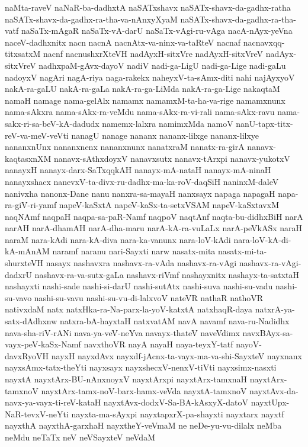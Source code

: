 {naMta-raveV
naNaR-ba-dadhxtA
naSATxshavx
naSATx-shavx-da-gadhx-ratha
naSATx-shavx-da-gadhx-ra-tha-va-nAnxyXyaM
naSATx-shavx-da-gadhx-ra-tha-vatf
naSaTx-mAgaR
naSaTx-vA-darU
naSaTx-vAgi-ru-vAga
nacA-nAyx-yeVna
naceV-dadhxnitx
nacn
nacnA
nacnAtx-va-ninx-va-taRteV
nacnaf
nacnavxqq-titxsatxM
nacnf
nacnushxrXteVH
nadAyxH-sitxVre
nadAyxH-sitxVreV
nadAyx-sitxVreV
nadhxpaM-gAvx-dayoV
nadiV
nadi-ga-LigU
nadi-ga-Lige
nadi-gaLu
nadoyxV
nagAri
nagA-riya
naga-rakekx
naheyxV-ta-sAmx-diti
nahi
najAyxyoV
nakA-ra-gaLU
nakA-ra-gaLa
nakA-ra-ga-LiMda
nakA-ra-ga-Lige
nakaqtaM
namaH
namage
nama-gelAlx
namamx
namamxM-ta-ha-va-rige
namamxnunx
nama-sAkxra
nama-sAkx-ra-veMdu
nama-sAkx-ra-vi-rali
nama-sAkx-ravu
nama-sakx-ri-sa-beV-kA-dadudx
namemx-lalxra
namimxMda
namoV
nanU-tapx-titx-reV-va-meV-veVti
nanagU
nanage
nananx
nananx-lilxge
nananx-lilxye
nananxnUnx
nananxnenx
nananxnunx
nanatxraM
nanatx-ra-girA
nanavx-kaqtasxnXM
nanavx-sAthxdoyxV
nanavxsutx
nanavx-tArxpi
nanavx-yukotxV
nanayxH
nanayx-darx-SaTxqqkAH
nanayx-mA-nataH
nanayx-mA-ninaH
nanayxshacx
nanevxV-ta-divx-ru-dadhx-ma-ka-roV-daqSiH
naninxM-daleV
nanivxha
nanonx-Dane
nanu
nanxra-sa-mayaH
nanxsayx
napaga
napagaH
napa-ra-giV-ri-yamf
napeV-kaSxtA
napeV-kaSx-ta-setxVSAM
napeV-kaSxtavxM
naqNAmf
naqpaH
naqpa-sa-paR-Namf
naqpoV
naqtAnf
naqta-bu-didhxBiH
narA
narAH
narA-dhamAH
narA-dha-maru
narA-kA-ra-vuLaLx
narA-peVkASx
naraH
naraM
nara-kAdi
nara-kA-diva
nara-ka-vanunx
nara-loV-kAdi
nara-loV-kA-di-kA-mAnAM
naramf
naranu
nari-Sayxti
narw
nasatx-mita
nasatx-mi-ta-shurxteVH
nasayx
nashavxra
nashavx-ra-vAda
nashavx-ra-vAgi
nashavx-ra-vAgi-dadxrU
nashavx-ra-va-sutx-gaLa
nashavx-riVmf
nashayxnitx
nashayx-ta-satxtaH
nashayxti
nashi-sade
nashi-si-darU
nashi-sutAtx
nashi-suva
nashi-su-vadu
nashi-su-vavo
nashi-su-vavu
nashi-su-vu-di-lalxvoV
nateVR
nathaR
nathoVR
nativxdaM
natx
natxHka-ra-Na-parx-la-yoV-katxtA
natxhaqR-daya
natxrA-ya-satx-dAdhxnw
natxra-bA-hayxtaH
natxvatAM
navA
navamf
nava-ru-Nadidhx
nava-sha-riV-rANi
nava-ya-veV-neYva
navayx-thateV
naveVdimx
navxBAyx-sa-vayx-peV-kaSx-Namf
navxthoVR
nayA
nayaH
naya-teyxY-tatf
nayoV-davxRyoVH
nayxH
nayxdAvx
nayxdf-jAcnx-ta-vayx-ma-va-shi-SayxteV
nayxnanx
nayxsAmx-tatx-theYti
nayxsayx
nayxshecxV-nenxV-tiVti
nayxsimx-nasxti
nayxtA
nayxtArx-BU-nAnxnoyxV
nayxtArxpi
nayxtArx-tamxnaH
nayxtArx-tamxnoV
nayxtArx-tamx-noV-barx-hamx-veVda
nayxtA-tamxnoV
nayxtAvx-da-navx-ya-vayx-ti-reV-kataH
nayxtAvx-dodxV-Sa-BA-kAsxyX-datoV
nayxtUpx-NaR-tevxV-neYti
nayxta-ma-sAyxpi
nayxtapxrX-pa-shayxti
nayxtarx
nayxtf
nayxthA
nayxthA-garxhaH
nayxtheY-veVmaM
ne
neDe-yu-vu-dilalx
neMba
neMdu
neTaTx
neV
neVSayxteV
neVdaM
}
